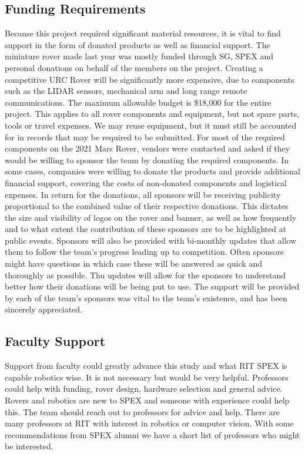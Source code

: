 \documentclass[conference]{IEEEtran} %
\begin{document}
\subsection{Funding Requirements}
\label{subsec:funding}
Because this project required significant material resources, it is vital to find support in the form of donated products as well as financial support. The miniature rover made last year was mostly funded through SG, SPEX and personal donations on behalf of the members on the project. Creating a competitive URC Rover will be significantly more expensive, due to components such as the LIDAR sensors, mechanical arm and long range remote communications. The maximum allowable budget is \$18,000 for the entire project. This applies to all rover components and equipment, but not spare parts, tools or travel expenses. We may reuse equipment, but it must still be accounted for in records that may be required to be submitted. For most of the required components on the 2021 Mars Rover, vendors were contacted and asked if they would be willing to sponsor the team by donating the required components. In some cases, companies were willing to donate the products and provide additional financial support, covering the costs of non-donated components and logistical expenses. In return for the donations, all sponsors will be receiving publicity proportional to the combined value of their respective donations. This dictates the size and visibility of logos on the rover and banner, as well as how frequently and to what extent the contribution of these sponsors are to be highlighted at public events. Sponsors will also be provided with bi-monthly updates that allow them to follow the team’s progress leading up to competition. Often sponsors might have questions in which case these will be answered as quick and thoroughly as possible. Thu updates will allow for the sponsors to understand better how their donations will be being put to use. The support will be provided by each of the team’s sponsors was vital to the team’s existence, and has been sincerely appreciated.

\subsection{Faculty Support}
\label{subsec:faculty}
Support from faculty could greatly advance this study and what RIT SPEX is capable robotics wise. It is not necessary but would be very helpful. Professors could help with funding, rover design, hardware selection and general advice. Rovers and robotics are new to SPEX and someone with experience could help this. The team should reach out to professors for advice
and help. There are many professors at RIT with interest in robotics or computer vision. With some recommendations from SPEX alumni we have a short list of professors who might be interested.
\end{document}
